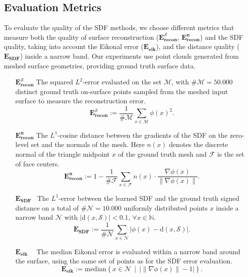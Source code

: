 \documentclass[draft,12pt,openany]{book}
\theoremstyle{plainnormal}
\theoremstyle{remark}
\begin{document}
\subsection{Evaluation Metrics}
To evaluate the quality of the SDF methods, we choose different metrics that measure both the quality of surface reconstruction (\(\mathbf{E_{recon}^{\mathcal{S}}}\), $\mathbf{E_{recon}^n}$) and the SDF quality, taking into account the Eikonal error ($\mathbf{E_{eik}}$), and the distance quality ($\mathbf{E_{SDF}}$) inside a narrow band. Our experiments use point clouds generated from meshed surface geometries, providing ground truth surface data.
\begin{enumerate}[align=left]
\item[\(\mathbf{E_{recon}^{\mathcal{S}}}\)]  The squared $L^2$-error evaluated on the set $\mathcal M$, with $\#\mathcal M = 50.000$ distinct ground truth on-surface points sampled from the meshed input surface to measure the reconstruction error.
 $$\mathbf{E_{recon}^{\mathcal{S}}}:=\frac{1}{\# \mathcal{M} }\sum_{x \in \mathcal{M}} \phi(x)^2.$$
\item[$\mathbf{E_{recon}^n}$] The $L^1$-cosine distance between the gradients of the SDF on the zero-level set and the normals of the mesh. Here $n(x)$ denotes the discrete normal of the triangle midpoint $x$ of the ground truth mesh and $\mathcal{F}$ is the set of face centers. 
$$\mathbf{E_{recon}^n} :=1 - \frac{1}{\#\mathcal{F}} \sum_{x\in \mathcal{F}} n(x)\cdot\frac{\nabla  \phi(x)}{\|\nabla \phi(x)\|}. $$
\item[$\mathbf{E_{SDF}\;\:}$] The $L^1$-error between the learned SDF and the ground truth signed distance on a total of $\#\mathcal N = 10.000$ uniformly distributed points $x$ inside a narrow band $\mathcal{N}$ with $|\mathrm{d}(x, \mathcal{S})| < 0.1$, $\forall x\in \mathbb N$.
$$\mathbf{E_{SDF}} := \frac{1}{\#\mathcal{N}}\sum_{x\in \mathcal{N}}|\phi(x) - \mathrm{d}(x, \mathcal{S})|.$$%
\item[\(\mathbf{E_{\text{eik}}}\ \ \;\:\)] The median Eikonal error is evaluated within a narrow band around the surface, using the same set of points as for the SDF error evaluation.
 $$\mathbf{E_{eik}} := \mathrm{median} \left\{x\in \mathcal{N} \, \mid\,  \big|\|\nabla\phi(x)\| - 1\big|\right\}. $$
\end{enumerate}
\end{document}
